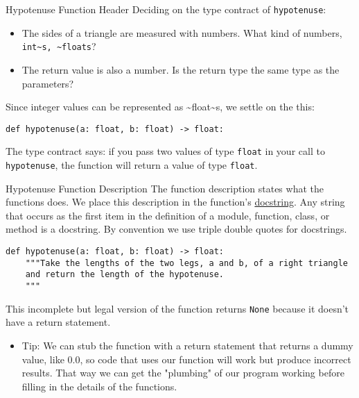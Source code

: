 \documentclass[smaller, aspectratio=1610]{beamer}
\begin{document}
\begin{frame}[label={sec:orgc422c92},fragile]{Hypotenuse Function Header}
 Deciding on the type contract of \texttt{hypotenuse}:

\begin{itemize}
\item The sides of a triangle are measured with numbers. What kind of numbers, \texttt{int\textasciitilde{}s, \textasciitilde{}floats}?
\item The return value is also a number.  Is the return type the same type as the parameters?
\end{itemize}

Since integer values can be represented as \textasciitilde{}float\textasciitilde{}s, we settle on the this:

\lstset{language=Python,label= ,caption= ,captionpos=b,numbers=none}
\begin{lstlisting}
def hypotenuse(a: float, b: float) -> float:
\end{lstlisting}

The type contract says: if you pass two values of type \texttt{float} in your call to \texttt{hypotenuse}, the function will return a value of type \texttt{float}.
\end{frame}

\begin{frame}[label={sec:org5a2c247},fragile]{Hypotenuse Function Description}
 The function description states what the functions does.  We place this description in the function's \href{https://www.python.org/dev/peps/pep-0257/}{docstring}.  Any string that occurs as the first item in the definition of a module, function, class, or method is a docstring.  By convention we use triple double quotes for docstrings.

\lstset{language=Python,label= ,caption= ,captionpos=b,numbers=none}
\begin{lstlisting}
def hypotenuse(a: float, b: float) -> float:
    """Take the lengths of the two legs, a and b, of a right triangle
    and return the length of the hypotenuse.
    """
\end{lstlisting}

This incomplete but legal version of the function returns \texttt{None} because it doesn't have a return statement.

\begin{itemize}
\item Tip: We can \alert{stub} the function with a return statement that returns a dummy value, like 0.0, so code that uses our function will work but produce incorrect results.  That way we can get the "plumbing" of our program working before filling in the details of the functions.
\end{itemize}
\end{frame}
\end{document}
